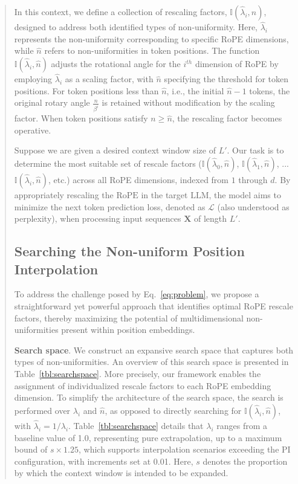 \begin{abstract}
In this context, we define a collection of rescaling factors, $\mathbb{I}(\hat{\lambda}_{i},\hat{n})$, designed to address both identified types of non-uniformity. Here, $\hat{\lambda}_i$ represents the non-uniformity corresponding to specific RoPE dimensions, while $\hat{n}$ refers to non-uniformities in token positions. The function $\mathbb{I}(\hat{\lambda}_{i},\hat{n})$ adjusts the rotational angle for the $i^{th}$ dimension of RoPE by employing $\hat{\lambda}_i$ as a scaling factor, with $\hat{n}$ specifying the threshold for token positions. For token positions less than $\hat{n}$, i.e., the initial $\hat{n}-1$ tokens, the original rotary angle $\frac{n}{\beta^i}$ is retained without modification by the scaling factor. When token positions satisfy $n\ge\hat{n}$, the rescaling factor becomes operative.

Suppose we are given a desired context window size of $L'$. Our task is to determine the most suitable set of rescale factors ($\mathbb{I}(\hat{\lambda}_{0},\hat{n})$, $\mathbb{I}(\hat{\lambda}_{1},\hat{n})$, ...$\mathbb{I}(\hat{\lambda}_{i},\hat{n})$, etc.) across all RoPE dimensions, indexed from $1$ through $d$. By appropriately rescaling the $\text{RoPE}$ in the target $\text{LLM}$, the model aims to minimize the next token prediction loss, denoted as $\mathcal{L}$ (also understood as perplexity), when processing input sequences $\mathbf{X}$ of length $L'$.

\subsection{Searching the Non-uniform Position Interpolation}

To address the challenge posed by Eq.~\ref{eq:problem}, we propose a straightforward yet powerful approach that identifies optimal RoPE rescale factors, thereby maximizing the potential of multidimensional non-uniformities present within position embeddings.

\textbf{Search space}. We construct an expansive search space that captures both types of non-uniformities. An overview of this search space is presented in Table~\ref{tbl:searchspace}. More precisely, our framework enables the assignment of individualized rescale factors to each RoPE embedding dimension. To simplify the architecture of the search space, the search is performed over $\lambda_i$ and $\hat{n}$, as opposed to directly searching for $\mathbb{I}(\hat{\lambda}_{i},\hat{n})$, with $\hat{\lambda}_{i}=1/\lambda_i$. Table~\ref{tbl:searchspace} details that $\lambda_i$ ranges from a baseline value of 1.0, representing pure extrapolation, up to a maximum bound of $s\times1.25$, which supports interpolation scenarios exceeding the PI configuration, with increments set at 0.01. Here, $s$ denotes the proportion by which the context window is intended to be expanded.


\end{abstract}
